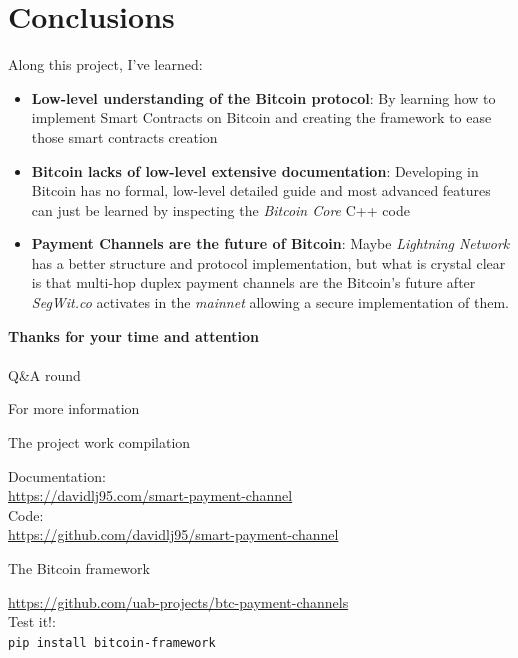 \documentclass{beamer}
\begin{document}
\section{Conclusions}
\begin{frame}
 Along this project, I've learned:
 \begin{itemize}[<+->]
  \item \textbf{Low-level understanding of the Bitcoin protocol}: By learning how to implement Smart Contracts on Bitcoin and creating the framework to ease those smart contracts creation
  \item \textbf{Bitcoin lacks of low-level extensive documentation}: Developing in Bitcoin has no formal, low-level detailed guide and most advanced features can just be learned by inspecting the \textit{Bitcoin Core} C++ code
  \item \textbf{Payment Channels are the future of Bitcoin}: Maybe \textit{Lightning Network} has a better structure and protocol implementation, but what is crystal clear is that multi-hop duplex payment channels are the Bitcoin's future after \textit{SegWit.co} activates in the \textit{mainnet} allowing a secure implementation of them.
 \end{itemize}
\end{frame}
\begin{frame}
 \begin{center}
  \textbf{\huge{Thanks for your time and attention}}\\~\\
  \pause
  \huge{Q\&A round}
 \end{center}
\end{frame}
\begin{frame}{For more information}
 \begin{block}{The project work compilation}
  \begin{center}
   Documentation:\\
   \url{https://davidlj95.com/smart-payment-channel}\\
   Code:\\
   \url{https://github.com/davidlj95/smart-payment-channel}
  \end{center}
 \end{block}
 \pause
 \begin{block}{The Bitcoin framework}
  \begin{center}
   \url{https://github.com/uab-projects/btc-payment-channels}\\
   \pause
   Test it!:\\
   \texttt{pip install bitcoin-framework}
  \end{center}
 \end{block}
\end{frame}
\end{document}
